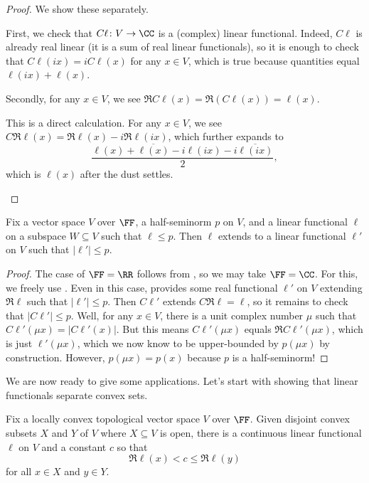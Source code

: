 \documentclass[notes.tex]{subfiles}
\begin{document}
\begin{proof}
	We show these separately.
	\begin{listalph}
		\item First, we check that $C\ell\colon V\to\CC$ is a (complex) linear functional. Indeed, $C\ell$ is already real linear (it is a sum of real linear functionals), so it is enough to check that $C\ell(ix)=iC\ell(x)$ for any $x\in V$, which is true because quantities equal $\ell(ix)+\ell(x)$.

		Secondly, for any $x\in V$, we see $\Re C\ell(x)=\Re(C\ell(x))=\ell(x)$.
		
		\item This is a direct calculation. For any $x\in V$, we see $C\Re\ell(x)=\Re\ell(x)-i\Re\ell(ix)$, which further expands to
		\[\frac{\ell(x)+\overline{\ell(x)}-i\ell(ix)-i\overline{\ell(ix)}}2,\]
		which is $\ell(x)$ after the dust settles.
		\qedhere
	\end{listalph}
\end{proof}
\begin{theorem} \label{thm:hahn-banach-exist}
	Fix a vector space $V$ over $\FF$, a half-seminorm $p$ on $V$, and a linear functional $\ell$ on a subspace $W\subseteq V$ such that $\ell\le p$. Then $\ell$ extends to a linear functional $\ell'$ on $V$ such that $\left|\ell'\right|\le p$.
\end{theorem}
\begin{proof}
	The case of $\FF=\RR$ follows from , so we may take $\FF=\CC$. For this, we freely use . Even in this case,  provides some real functional $\ell'$ on $V$ extending $\Re\ell$ such that $\left|\ell'\right|\le p$. Then $C\ell'$ extends $C\Re\ell=\ell$, so it remains to check that $\left|C\ell'\right|\le p$. Well, for any $x\in V$, there is a unit complex number $\mu$ such that $C\ell'(\mu x)=\left|C\ell'(x)\right|$. But this means $C\ell'(\mu x)$ equals $\Re C\ell'(\mu x)$, which is just $\ell'(\mu x)$, which we now know to be upper-bounded by $p(\mu x)$ by construction. However, $p(\mu x)=p(x)$ because $p$ is a half-seminorm!
\end{proof}
We are now ready to give some applications. Let's start with showing that linear functionals separate convex sets.
\begin{theorem} \label{thm:hahn-banach-separate}
	Fix a locally convex topological vector space $V$ over $\FF$. Given disjoint convex subsets $X$ and $Y$ of $V$ where $X\subseteq V$ is open, there is a continuous linear functional $\ell$ on $V$ and a constant $c$ so that
	\[\Re\ell(x)<c\le\Re\ell(y)\]
	for all $x\in X$ and $y\in Y$.
\end{theorem}
\end{document}
